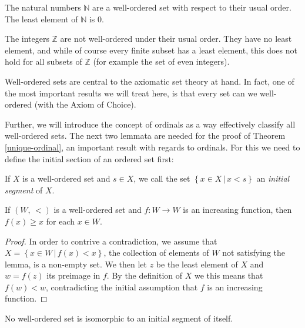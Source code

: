 \documentclass[../../main.tex]{subfiles}
\begin{document}
\begin{example}
    The natural numbers $\mathbb{N}$ are a well-ordered set with respect to their usual order.
    The least element of $\mathbb{N}$ is $0$.
\end{example}

\begin{example}
    The integers $\mathbb{Z}$ are not well-ordered under their usual order.
    They have no least element, and while of course every finite subset has a least element, 
    this does not hold for all subsets of $\mathbb{Z}$ (for example the set of even integers).
\end{example}

Well-ordered sets are central to the axiomatic set theory at hand.
In fact, one of the most important results we will treat here, is that every set can we well-ordered (with the Axiom of Choice).

Further, we will introduce the concept of ordinals as a way effectively classify all well-ordered sets.
The next two lemmata are needed for the proof of Theorem \ref{unique-ordinal}, an important result with regards to ordinals.
For this we need to define the initial section of an ordered set first:

\begin{definition}
    If $X$ is a well-ordered set and $s \in X$, we call the set $\left\{x \in X \,\vert\, x < s\right\}$ an \textit{initial segment} of $X$.
\end{definition}

\begin{lemma}\label{increasing-fcn-lemm}\cite[Lemma 2.1, p.13]{Jec78}
    If $\left(W,\, <\right)$ is a well-ordered set and $f: W \to W$ is an increasing function, then $f(x) \geq x$ for each $x\in W$.
\end{lemma}

\begin{proof}\cite[Lemma 2.1, p.13]{Jec78}
    In order to contrive a contradiction, we assume that $X = \left\{x \in W \,\vert\, f(x) < x\right\}$, the collection of elements of $W$ not satisfying the lemma, is a non-empty set.
    We then let $z$ be the least element of $X$ and $w = f(z)$ its preimage in $f$.
    By the definition of $X$ we this means that $f(w) < w$, contradicting the initial assumption that $f$ is an increasing function.
\end{proof}

\begin{lemma}\cite[Lemma 2.2, p.13]{Jec78}\label{initial-segment-isomorphism}
    No well-ordered set is isomorphic to an initial segment of itself.
\end{lemma}
\end{document}
